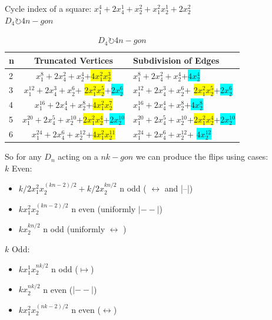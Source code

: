 \documentclass{beamer}
\begin{document}
\begin{frame}
Cycle index of a square:
$x_1^4+2x_4^1+x_2^2+x_1^2x_2^1+2x_2^2$\\

$D_4 \circlearrowright 4n-gon$\\

\begin{table}
\centering
\begin{tabular}{l|c|l}
n & Truncated Vertices & Subdivision of Edges\\ \hline
2 &
$x_1^8+2x_4^2+x_2^4$+\colorbox{yellow}{$4x_1^2x_2^3$} &
$x_1^8+2x_4^2+x_2^4$+\colorbox{cyan}{$4x_2^4$}\\
3 &
$x_1^{12} +2x_4^3+x_2^6$+ \colorbox{yellow}{$2x_1^2x_2^5$}+\colorbox{cyan}{$2x_2^6$} &
$x_1^{12} +2x_4^3+x_2^6$+ \colorbox{yellow}{$2x_1^2x_2^5$}+\colorbox{cyan}{$2x_2^6$}\\
4 &
$x_1^{16}+2x_4^4+x_2^8$+\colorbox{yellow}{$4x_1^2x_2^7$} &
$x_1^{16}+2x_4^4+x_2^8$+\colorbox{cyan}{$4x_2^8$}\\
5 &
$x_1^{20}+2x_4^5+x_2^{10}$+\colorbox{yellow}{$2x_1^2x_2^4$}+\colorbox{cyan}{$2x_2^{10}$} &
$x_1^{20}+2x_4^5+x_2^{10}$+\colorbox{yellow}{$2x_1^2x_2^4$}+\colorbox{cyan}{$2x_2^{10}$}\\
6 & $x_1^{24}+2x_4^6+x_2^{12}$+\colorbox{yellow}{$4x_1^2x_2^{11}$} & $ x_1^24+2x_4^6+x_2^{12}$+ \colorbox{cyan}{$4x_2^{12}$}\\

\end{tabular}
\caption{$D_4 \circlearrowright 4n-gon$}
\end{table}
\end{frame}

\begin{frame}{}
So for any $D_n$ acting on a $nk-gon$ we can produce the flips using cases:\\
	 $k$ Even:\\
			\begin{itemize}
    			\item $k/2x_1^2x_2^{(kn-2)/2}+k/2x_2^{kn/2}$ n odd ( $\longleftrightarrow$ and |--|)
                \item $kx_1^2x_2^{(kn-2)/2}$ n even (uniformly $|--|$)
                \item $kx_2^{kn/2}$ n odd (uniformly $\longleftrightarrow$ )
             \end{itemize}
         $k$ Odd:\\
         	\begin{itemize}
            	\item $kx_1^1x_2^{nk/2}$ n odd ($\mapsto$)
                \item $kx_2^{nk/2}$ n even ($|--|$)
                \item $kx_1^2x_2^{(nk-2)/2}$ n even ($\longleftrightarrow$)
            \end{itemize}

\end{frame}
\end{document}
